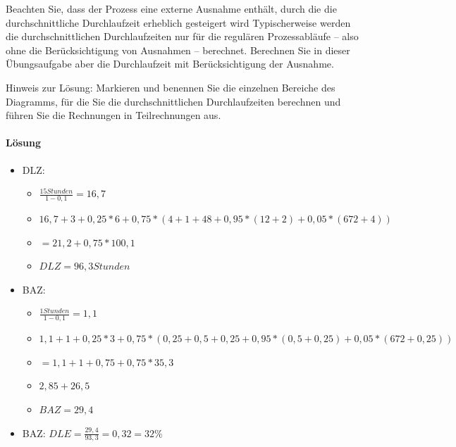         Beachten Sie, dass der Prozess eine externe Ausnahme enthält, durch die die durchschnittliche Durchlaufzeit erheblich gesteigert wird Typischerweise werden die durchschnittlichen Durchlaufzeiten nur für die regulären Prozessabläufe – also ohne die Berücksichtigung von Ausnahmen – berechnet. Berechnen Sie in dieser Übungsaufgabe aber die Durchlaufzeit mit Berücksichtigung der Ausnahme.

        Hinweis zur Lösung: Markieren und benennen Sie die einzelnen Bereiche des Diagramms, für die Sie die durchschnittlichen Durchlaufzeiten berechnen und führen Sie die Rechnungen in Teilrechnungen aus.
    \paragraph*{Lösung}
        \begin{itemize}
            \item DLZ: 
                \begin{itemize}
                    \item $\frac{15 Stunden}{1-0,1} = 16,7$
                    \item $16,7 + 3 + 0,25 * 6 + 0,75 * (4 + 1 + 48 + 0,95 * (12 + 2) + 0,05 * (672+4))$
                    \item $= 21,2 + 0,75*100,1$
                    \item $DLZ = 96,3 Stunden$
                \end{itemize}
            \item BAZ:
                \begin{itemize}
                    \item $\frac{1 Stunden}{1-0,1} = 1,1$
                    \item $1,1 + 1 + 0,25 * 3 + 0,75 * (0,25 + 0,5 + 0,25 + 0,95 * (0,5 + 0,25) + 0,05 * (672+0,25))$
                    \item $= 1,1 + 1 + 0,75 + 0,75 * 35,3$
                    \item $2,85 + 26,5$
                    \item $BAZ = 29,4$
                \end{itemize}
            \item BAZ: $DLE = \frac{29,4}{93,3}=0,32=32\%$
        \end{itemize}
        